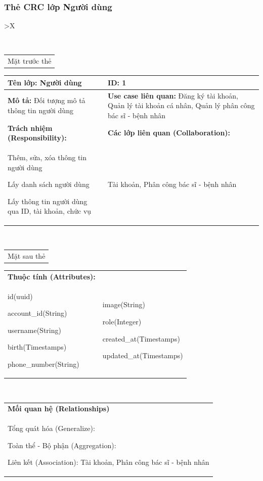 \subsubsection{Thẻ CRC lớp Người dùng}
\begin{xltabular}{\textwidth}{
   >{\centering\arraybackslash}X 
  }
  \caption{\bfseries \fontsize{12pt}{0pt}\selectfont Thẻ CRC lớp Người dùng}
  \\
  \begin{tabularx}{0.9\textwidth}{X}
    Mặt trước thẻ
  \end{tabularx}
  \begin{tabularx}{0.9\textwidth}{|X|X|}
    \hline
    \textbf{Tên lớp:} Người dùng & \textbf{ID:} 1 \\
    \hline
    \textbf{Mô tả:} Đối tượng mô tả thông tin người dùng & \textbf{Use case liên quan:}  Đăng ký tài khoản, Quản lý tài khoản cá nhân, Quản lý phân công bác sĩ - bệnh nhân\\
    \hline
    \textbf{Trách nhiệm (Responsibility):} & \textbf{Các lớp liên quan (Collaboration):} \\
    Thêm, sửa, xóa thông tin người dùng 

    Lấy danh sách người dùng

    Lấy thông tin người dùng qua ID, tài khoản, chức vụ
    & 
    Tài khoản, Phân công bác sĩ - bệnh nhân
    \\
    \hline
  \end{tabularx}
  \\ 
  \begin{tabularx}{0.9\textwidth}{X}
    Mặt sau thẻ
  \end{tabularx} 
  \begin{tabularx}{0.9\textwidth}{|X|X|}
    \hline
    \textbf{Thuộc tính (Attributes):} & \\
    id(uuid) 
    
    account\_id(String)

    username(String)

    birth(Timestamps)

    phone\_number(String)
    & 
    image(String) 
    
    role(Integer) 
    
    created\_at(Timestamps)

    updated\_at(Timestamps)
    \\ \hline
  \end{tabularx}
  \\     
  \begin{tabularx}{0.9\textwidth}{|X|}
    \hline
   \textbf{Mối quan hệ (Relationships)} \\
    Tổng quát hóa (Generalize):  

    Toàn thể - Bộ phận (Aggregation):
    
    Liên kết (Association): Tài khoản, Phân công bác sĩ - bệnh nhân 
    \\
    \hline
  \end{tabularx}
  \end{xltabular}

